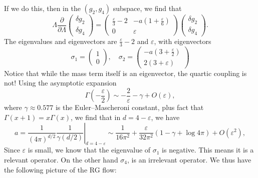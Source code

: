\documentclass[a4paper]{article}
\begin{document}
If we do this, then in the $(g_2, g_4)$ subspace, we find that
\[
  \Lambda \frac{\partial}{\partial \Lambda}
  \begin{pmatrix}
    \delta g_2\\
    \delta g_4
  \end{pmatrix} =
  \begin{pmatrix}
    \frac{\varepsilon}{3} - 2 & -a \left( 1+ \frac{\varepsilon}{6}\right)\\
    0 & \varepsilon
  \end{pmatrix}
  \begin{pmatrix}
    \delta g_2\\
    \delta g_4
  \end{pmatrix}.
\]
The eigenvalues and eigenvectors are $\frac{\varepsilon}{3} - 2$ and $\varepsilon$, with eigenvectors
\[
  \sigma_1=
  \begin{pmatrix}
    1\\0
  \end{pmatrix},\quad
  \sigma_2 =
  \begin{pmatrix}
    -a\left(3 + \frac{\varepsilon}{2}\right)\\
    2(3 + \varepsilon)
  \end{pmatrix}
\]
Notice that while the mass term itself is an eigenvector, the quartic coupling is not! Using the asymptotic expansion
\[
  \Gamma\left(-\frac{\varepsilon}{2}\right) \sim -\frac{2}{\varepsilon} - \gamma + O(\varepsilon),
\]
where $\gamma \approx 0.577$ is the Euler--Mascheroni constant, plus fact that $\Gamma(x + 1) = x \Gamma(x)$, we find that in $d = 4 - \varepsilon$, we have
\[
  a = \left.\frac{1}{(4\pi)^{d/2}} \frac{1}{\gamma(d/2)} \right|_{d = 4 - \varepsilon} \sim \frac{1}{16 \pi^2} + \frac{\varepsilon}{32\pi^2} (1 - \gamma + \log 4\pi) + O(\varepsilon^2),
\]
Since $\varepsilon$ is small, we know that the eigenvalue of $\sigma_1$ is negative. This means it is a relevant operator. On the other hand $\sigma_4$, is an irrelevant operator. We thus have the following picture of the RG flow:
\end{document}
